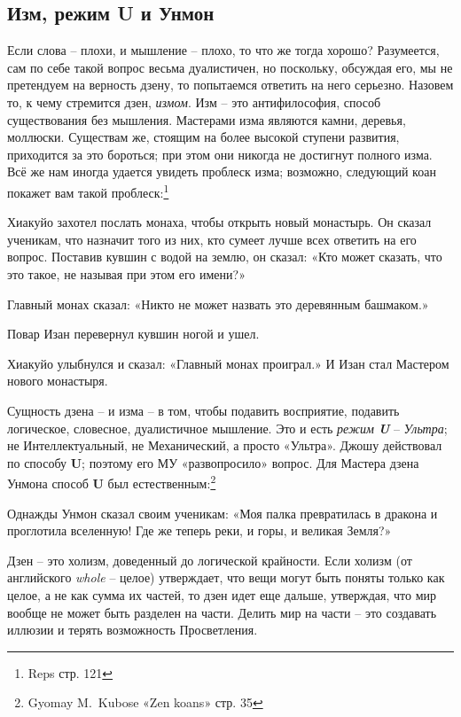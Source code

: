 \documentclass[../main.tex]{subfiles}
\begin{document}
\subsection{Изм, режим U и Унмон}

Если слова \--- плохи, и мышление \--- плохо, то что же тогда хорошо? Разумеется, сам по себе такой вопрос весьма дуалистичен, но поскольку, обсуждая его, мы не претендуем на верность дзену, то попытаемся ответить на него серьезно. Назовем то, к чему стремится дзен, \emph{измом}. Изм \--- это антифилософия, способ существования без мышления. Мастерами изма являются камни, деревья, моллюски. Существам же, стоящим на более высокой ступени развития, приходится за это бороться; при этом они никогда не достигнут полного изма. Всё же нам иногда удается увидеть проблеск изма; возможно, следующий коан покажет вам такой проблеск:\footnote{Reps стр. 121}

\begin{koan}
    Хиакуйо захотел послать монаха, чтобы открыть новый монастырь. Он сказал ученикам, что назначит того из них, кто сумеет лучше всех ответить на его вопрос. Поставив кувшин с водой на землю, он сказал: «Кто может сказать, что это такое, не называя при этом его имени?»

    Главный монах сказал: «Никто не может назвать это деревянным башмаком.»

    Повар Изан перевернул кувшин ногой и ушел.

    Хиакуйо улыбнулся и сказал: «Главный монах проиграл.» И Изан стал Мастером нового монастыря.
\end{koan}

Сущность дзена \--- и изма \--- в том, чтобы подавить восприятие, подавить логическое, словесное, дуалистичное мышление. Это и есть \emph{режим \textbf{U}} \--- \emph{Ультра}; не Интеллектуальный, не Механический, а просто «Ультра». Джошу действовал по способу \textbf{U}; поэтому его МУ «развопросило» вопрос. Для Мастера дзена Унмона способ \textbf{U} был естественным:\footnote{Gyomay M.~Kubose «Zen koans» стр. 35}

\begin{koan}
    Однажды Унмон сказал своим ученикам: «Моя палка превратилась в дракона и проглотила вселенную! Где же теперь реки, и горы, и великая Земля?»
\end{koan}

Дзен \--- это холизм, доведенный до логической крайности. Если холизм (от английского \emph{whole} \--- целое) утверждает, что вещи могут быть поняты только как целое, а не как сумма их частей, то дзен идет еще дальше, утверждая, что мир вообще не может быть разделен на части. Делить мир на части \--- это создавать иллюзии и терять возможность Просветления.
\end{document}
